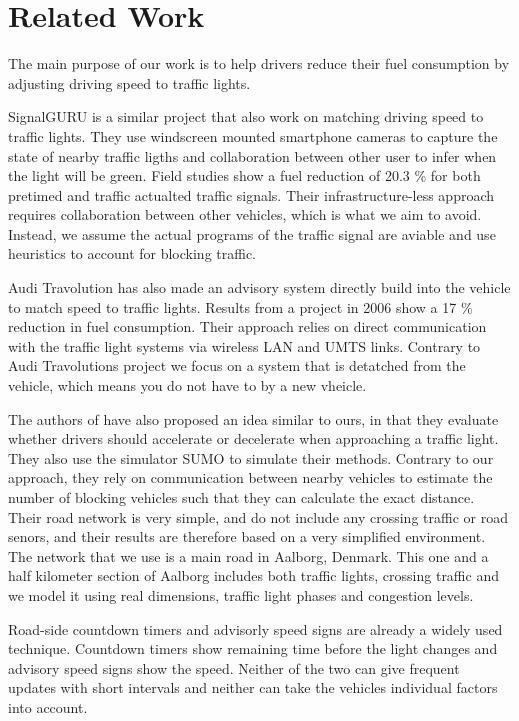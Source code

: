 \section{Related Work}\label{sec:RelatedWork}
The main purpose of our work is to help drivers reduce their fuel consumption by adjusting driving speed to traffic lights.

SignalGURU\cite{SignalGURU} is a similar project that also work on matching driving speed to traffic lights.
They use windscreen mounted smartphone cameras to capture the state of nearby traffic ligths and collaboration between other user to infer when the light will be green.
Field studies show a fuel reduction of 20.3 \% for both pretimed and traffic actualted traffic signals.
Their infrastructure-less approach requires collaboration between other vehicles, which is what we aim to avoid.
Instead, we assume the actual programs of the traffic signal are aviable and use heuristics to account for blocking traffic.

Audi Travolution\cite{audi} has also made an advisory system directly build into the vehicle to match speed to traffic lights.
Results from a project in 2006 show a 17 \% reduction in fuel consumption.
Their approach relies on direct communication with the traffic light systems via wireless LAN and UMTS links.
Contrary to Audi Travolutions project we focus on a system that is detatched from the vehicle, which means you do not have to by a new vheicle.

The authors of \cite{VANETsim} have also proposed an idea similar to ours, in that they evaluate whether drivers should accelerate or decelerate when approaching a traffic light.
They also use the simulator SUMO to simulate their methods.
Contrary to our approach, they rely on communication between nearby vehicles to estimate the number of blocking vehicles such that they can calculate the exact distance.
Their road network is very simple, and do not include any crossing traffic or road senors, and their results are therefore based on a very simplified environment. 
The network that we use is a main road in Aalborg, Denmark. 
This one and a half kilometer section of Aalborg includes both traffic lights, crossing traffic and we model it using real dimensions, traffic light phases and congestion levels.

Road-side countdown timers and advisorly speed signs\cite{transyt} are already a widely used technique.
Countdown timers show remaining time before the light changes and advisory speed signs show the speed.
Neither of the two can give frequent updates with short intervals and neither can take the vehicles individual factors into account.


